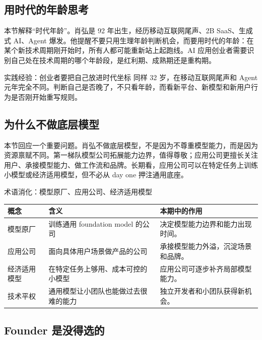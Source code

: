 \documentclass[a4paper]{article}
\begin{document}
\subsection{用时代的年龄思考}

本节解释“时代年龄”。肖弘是 92 年出生，经历移动互联网尾声、2B SaaS、生成式 AI、Agent 爆发。他提醒不要只用生理年龄判断机会，而要用时代的年龄：在某个新技术周期刚开始时，所有人都可能重新站上起跑线。AI 应用创业者需要识别自己处在技术周期的哪个年龄段，是红利期、成熟期还是重构期。

\begin{importantbox}{实践经验：创业者要把自己放进时代坐标}
同样 32 岁，在移动互联网尾声和 Agent 元年完全不同。判断自己是否晚了，不只看年龄，而看新平台、新模型和新用户行为是否刚开始重写规则。
\end{importantbox}

\subsection{为什么不做底层模型}

本节回应一个重要问题。肖弘不做底层模型，不是因为不尊重模型能力，而是因为资源禀赋不同。第一梯队模型公司拓展能力边界，值得尊敬；应用公司更擅长关注用户、承接模型能力、做工作流和品牌。长期看，应用公司可以在特定任务上训练小模型或经济适用模型，但不必从 day one 押注通用底座。

\begin{knowledgebox}{术语消化：模型原厂、应用公司、经济适用模型}
\noindent\begin{tabularx}{\textwidth}{p{}p{}X}
\toprule
概念 & 含义 & 本期中的作用 \\
\midrule
模型原厂 & 训练通用 foundation model 的公司 & 决定模型能力边界和能力出现时间。 \\
应用公司 & 面向具体用户场景做产品的公司 & 承接模型能力外溢，沉淀场景和品牌。 \\
经济适用模型 & 在特定任务上够用、成本可控的小模型 & 应用公司可逐步补齐局部模型能力。 \\
技术平权 & 通用模型让小团队也能做过去很难的能力 & 独立开发者和小团队获得新机会。 \\
\bottomrule
\end{tabularx}
\end{knowledgebox}

\subsection{Founder 是没得选的}
\end{document}
